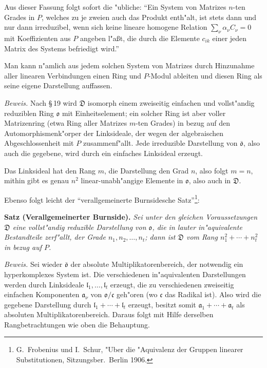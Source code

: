 \documentclass[12pt,a4paper]{article}
\theoremstyle{plain}
\begin{document}
Aus dieser Fassung folgt sofort die "ubliche: ``Ein System von Matrizes $n$-ten Grades in $P$, welches zu je zweien auch das Produkt enth"alt, ist stets dann und nur dann irreduzibel, wenn sich keine lineare homogene Relation $\sum_\nu \alpha_\nu C_\nu = 0$ mit Koeffizienten aus $P$ angeben l"a\ss t, die durch die Elemente $c_{ik}$ einer jeden Matrix des Systems befriedigt wird.''

Man kann n"amlich aus jedem solchen System von Matrizes durch Hinzunahme aller linearen Verbindungen einen Ring und $P$-Modul ableiten und diesen Ring als seine eigene Darstellung auffassen.

\noindent\textit{Beweis.}
Nach \S\,19 wird $\mathfrak{D}$ isomorph einem zweiseitig einfachen und vollst"andig reduziblen Ring $\mathfrak{o}$ mit Einheitselement; ein solcher Ring ist aber voller Matrizenring (etwa Ring aller Matrizes $m$-ten Grades) in bezug auf den Automorphismenk"orper der Linksideale, der wegen der algebraischen Abgeschlossenheit mit $P$ zusammenf"allt. Jede irreduzible Darstellung von $\bar{\mathfrak{o}}$, also auch die gegebene, wird durch ein einfaches Linksideal erzeugt.

Das Linksideal hat den Rang $m$, die Darstellung den Grad $n$, also folgt $m = n$, mithin gibt es genau $n^2$ linear-unabh"angige Elemente in $\mathfrak{o}$, also auch in $\mathfrak{D}$.

Ebenso folgt leicht der ``verallgemeinerte Burnsidesche Satz''\footnote{G.\ Frobenius und I.\ Schur, "Uber die "Aquivalenz der Gruppen linearer Substitutionen, Sitzungsber.\ Berlin 1906.}:

\medskip\noindent\textbf{Satz (Verallgemeinerter Burnside).}
\textit{Sei unter den gleichen Voraussetzungen $\mathfrak{D}$ eine vollst"andig reduzible Darstellung von $\mathfrak{o}$, die in lauter in"aquivalente Bestandteile zerf"allt, der Grade $n_1, n_2, \ldots, n_t$; dann ist $\mathfrak{D}$ vom Rang $n_1^2 + \cdots + n_t^2$ in bezug auf $P$.}

\noindent\textit{Beweis.}
Sei wieder $\bar{\mathfrak{o}}$ der absolute Multiplikatorenbereich, der notwendig ein hyperkomplexes System ist. Die verschiedenen in"aquivalenten Darstellungen werden durch Linksideale $\mathfrak{l}_1, \ldots, \mathfrak{l}_t$ erzeugt, die zu verschiedenen zweiseitig einfachen Komponenten $\mathfrak{a}_\nu$ von $\mathfrak{o}/\mathfrak{c}$ geh"oren (wo $\mathfrak{c}$ das Radikal ist). Also wird die gegebene Darstellung durch $\mathfrak{l}_1 + \cdots + \mathfrak{l}_t$ erzeugt, besitzt somit $\mathfrak{a}_1 + \cdots + \mathfrak{a}_t$ als absoluten Multiplikatorenbereich. Daraus folgt mit Hilfe derselben Rangbetrachtungen wie oben die Behauptung.
\end{document}
